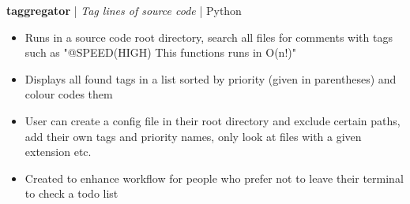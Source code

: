 \item \textbf{taggregator} | \textit{Tag lines of source code} | {Python}
\begin{itemize}
    \item Runs in a source code root directory, search all files for comments with tags such as "@SPEED(HIGH) This functions runs in O(n!)"
    \item Displays all found tags in a list sorted by priority (given in parentheses) and colour codes them
    \item User can create a config file in their root directory and exclude certain paths, add their own tags and priority names, only look at files with a given extension etc.
    \item Created to enhance workflow for people who prefer not to leave their terminal to check a todo list
\end{itemize}
